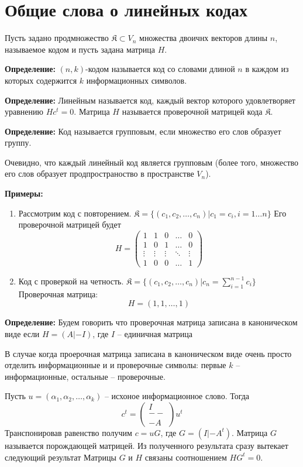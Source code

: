 \documentclass{article}
\newcommand{\DEF}[1] {
    \textbf{Определение: } #1
}
\newcommand{\EXMP} {\textbf{Примеры: }}
\begin{document}
    \section{Общие слова о линейных кодах}

    Пусть задано продмножество $\mathfrak{K} \subset V_n$ множества двоичнх векторов длины $n$, называемое кодом и пусть задана матрица $H$.

    \DEF{$(n, k)$-кодом называется код со словами длиной $n$ в каждом из которых содержится $k$ информационных символов.}

    \DEF{Линейным называется код, каждый вектор которого удовлетворяет уравнению $Hc^t = 0$. Матрица $H$ называется проверочной матрицей кода $\mathfrak{K}$.}

    \DEF{Код называется групповым, если множество его слов образует группу.}

    Очевидно, что каждый линейный код является групповым (более того, множество его слов образует продпространоство в пространстве $V_n$).

    \EXMP 
    \begin{enumerate}
        \item Рассмотрим код с повторением. $\mathfrak{K} = \{ (c_1, c_2, \dots , c_n) | c_1 = c_i, i=1\dots n \}$
            Его проверочной матрицей будет 
            $$
            H = \begin{pmatrix}
                1 & 1 & 0 & \dots & 0 \\
                1 & 0 & 1 & \dots & 0 \\
                \vdots & \vdots & \vdots & \ddots & \vdots\\
                1 & 0 & 0 & \dots & 1 
            \end{pmatrix}
            $$
        \item Код с проверкой на четность. $\mathfrak{K} = \{ (c_1, c_2, \dots , c_n) | c_n = \sum_{i = 1}^{n - 1} c_i \}$
            Проверочная матрица:
            $$
            H = (1, 1, \dots , 1)
            $$
    \end{enumerate}

    \DEF{Будем говорить что проверочная матрица записана в каноническом виде если $H = (A | -I)$, где $I$ -- единичная матрица}

    В случае когда проерочная матрица записана в каноническом виде очень просто отделить информационные и и проверочные символы:
    первые $k$ -- информационные, остальные -- проверочные.

    Пусть $u = (\alpha_1, \alpha_2, \dots ,\alpha_k)$ -- исхоное информационное слово. Тогда 
    $$
        c^t = \begin{pmatrix} I \\ -- \\ -A \end{pmatrix} u^t
    $$
    Транспонировав равенство получим $c = uG$, где $G = (I | -A^t)$. Матрица $G$ называется порождающей матрицей. Из полученного результата сразу вытекает следующий результат
    Матрицы $G$ и $H$ связаны соотношением $HG^t = 0$.
\end{document}
